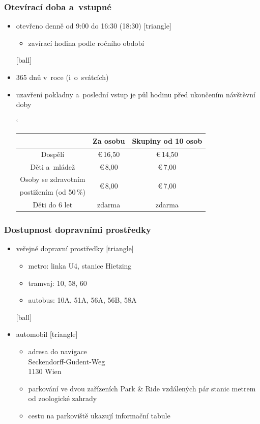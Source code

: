 \documentclass[pdf]{beamer}
\begin{document}
\begin{frame}
\frametitle{Otevírací doba a~vstupné}
\begin{itemize}
\item{otevřeno denně od 9:00 do 16:30 (18:30)}
 [triangle]
\begin{itemize}
\item{zavírací hodina podle ročního období}
\end{itemize}
[ball]
\item{365 dnů v~roce (i~o~svátcích)}
\item{uzavření pokladny a~poslední vstup je půl hodinu před ukončením návštěvní doby}
\begin{table}[h]
\begin{center}
\catcode`
\begin{tabular}{|c|c|c|}\hline
& Za osobu & Skupiny od 10 osob\\ \hline
Dospělí & \euro\,16,50 & \euro\,14,50\\ \hline
Děti a~mládež & \euro\,8,00 & \euro\,7,00\\ \hline
Osoby se zdravotním  & \multirow{2}{*}{\euro\,8,00} & \multirow{2}{*}{\euro\,7,00}\\ 
postižením (od 50\,\%) & & \\ \hline
Děti do 6 let & zdarma & zdarma\\ \hline
\end{tabular}
\end{center}
\end{table}
\end{itemize}
\end{frame}

\begin{frame}
\frametitle{Dostupnost dopravními prostředky}
\begin{itemize}
\item{veřejné dopravní prostředky}
[triangle]
\begin{itemize}
\item{metro: linka U4, stanice Hietzing}
\item{tramvaj: 10, 58, 60}
\item{autobus: 10A, 51A, 56A, 56B, 58A}
\end{itemize}
[ball]
\item{automobil}
[triangle]
\begin{itemize}
\item{adresa do navigace\\Seckendorff-Gudent-Weg\\1130 Wien}
\item{parkování ve dvou zařízeních Park \& Ride vzdálených pár stanic metrem od zoologické zahrady }
\item{cestu na parkoviště ukazují informační tabule}
\end{itemize}
\end{itemize}
\end{frame}
\end{document}
